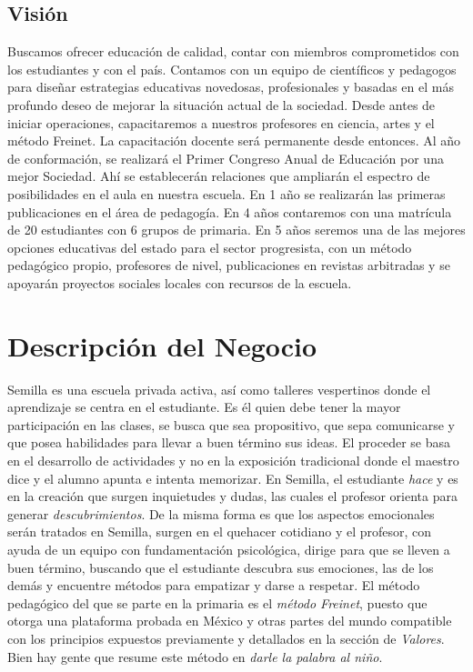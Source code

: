 \documentclass[10pt,letterpaper,oneside]{book}
\begin{document}
\subsection*{Visión}
Buscamos ofrecer educación de calidad, contar con miembros comprometidos con los estudiantes y con el país. Contamos con un equipo de científicos y pedagogos para diseñar estrategias educativas novedosas, profesionales y basadas en el más profundo deseo de mejorar la situación actual de la sociedad. Desde antes de iniciar operaciones, capacitaremos a nuestros profesores en ciencia, artes y el método Freinet. La capacitación docente será permanente desde entonces. Al año de conformación, se realizará el Primer Congreso Anual de Educación por una mejor Sociedad. Ahí se establecerán relaciones que ampliarán el espectro de posibilidades en el aula en nuestra escuela. En 1 año se realizarán las primeras publicaciones en el área de pedagogía. En 4 años contaremos con una matrícula de 20 estudiantes con 6 grupos de primaria. En 5 años seremos una de las mejores opciones educativas del estado para el sector progresista, con un método pedagógico propio, profesores de nivel, publicaciones en revistas arbitradas y se apoyarán proyectos sociales locales con recursos de la escuela.

\section{Descripción del Negocio}

Semilla es una escuela privada activa, así como talleres vespertinos donde el aprendizaje se centra en el estudiante. Es él quien debe tener la mayor participación en las clases, se busca que sea propositivo, que sepa comunicarse y que posea habilidades para llevar a buen término sus ideas. El proceder se basa en el desarrollo de actividades y no en la exposición tradicional donde el maestro dice y el alumno apunta e intenta memorizar. En Semilla, el estudiante \emph{hace} y es en la creación que surgen inquietudes y dudas, las cuales el profesor orienta para generar \emph{descubrimientos}. De la misma forma es que los aspectos emocionales serán tratados en Semilla, surgen en el quehacer cotidiano y el profesor, con ayuda de un equipo con fundamentación psicológica, dirige para que se lleven a buen término, buscando que el estudiante descubra sus emociones, las de los demás y encuentre métodos para empatizar y darse a respetar. El método pedagógico del que se parte en la primaria es el \emph{método Freinet}, puesto que otorga una plataforma probada en México y otras partes del mundo compatible con los principios expuestos previamente y detallados en la sección de \emph{Valores}. Bien hay gente que resume este método en \emph{darle la palabra al niño}.
\end{document}
